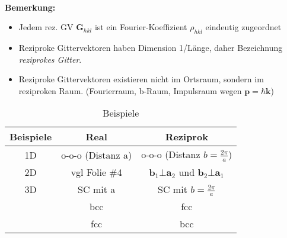 \begin{itemize}
\begin{itemize}
\begin{align*}
                \end{align*}
          \end{itemize}
          \textbf{Bemerkung:}
          \begin{itemize}
              \item Jedem rez. GV $\textbf{G}_{hkl}$ ist ein Fourier-Koeffizient $\rho_{hkl}$ eindeutig zugeordnet
              \item Reziproke Gittervektoren haben Dimension 1/Länge, daher Bezeichnung \textit{reziprokes Gitter}.
              \item Reziproke Gittervektoren existieren nicht im Ortsraum, sondern im reziproken Raum. (Fourierraum, b-Raum,  Impulsraum wegen $\textbf{p}= \hbar \textbf{k}$)
          \end{itemize}
          \begin{table}[htbp]
              \centering
              \caption{Beispiele}
              \begin{tabular}{ccc}
                  \hline
                  Beispiele & Real                & Reziprok                                                            \\ \hline
                  1D        & o-o-o (Distanz a) & o-o-o  (Distanz $b =  \frac{2\pi}{a}$)                                 \\
                  2D        & vgl Folie \#4       & $\textbf{b}_1 \bot \textbf{a}_2$ und $\textbf{b}_2 \bot \textbf{a}_1$ \\
                  3D        & SC mit a            & SC mit $b=\frac{2\pi}{a}$                                             \\
                            & bcc                 & fcc                                                                   \\
                            & fcc                 & bcc                                                                   \\ \hline
              \end{tabular}
          \end{table}


\end{itemize}
